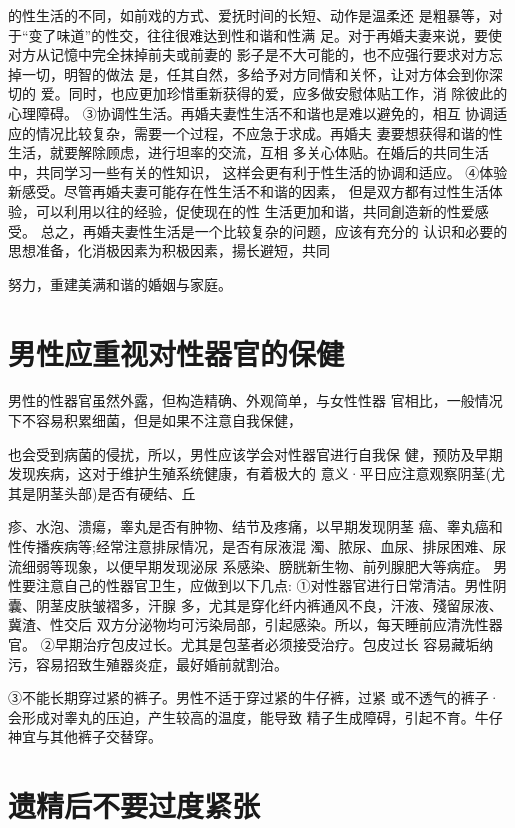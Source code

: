 \documentclass[12pt,UTF8]{ctexbook}
\begin{document}
的性生活的不同，如前戏的方式、爱抚时间的长短、动作是温柔还
是粗暴等，对于“变了味道”的性交，往往很难达到性和谐和性满
足。对于再婚夫妻来说，要使对方从记憶中完全抹掉前夫或前妻的
影子是不大可能的，也不应强行要求对方忘掉一切，明智的做法
是，任其自然，多给予对方同情和关怀，让对方体会到你深切的
爱。同时，也应更加珍惜重新获得的爱，应多做安慰体贴工作，消
除彼此的心理障碍。
③协调性生活。再婚夫妻性生活不和谐也是难以避免的，相互
协调适应的情况比较复杂，需要一个过程，不应急于求成。再婚夫
妻要想获得和谐的性生活，就要解除顾虑，进行坦率的交流，互相
多关心体贴。在婚后的共同生活中，共同学习一些有关的性知识，
这样会更有利于性生活的协调和适应。
④体验新感受。尽管再婚夫妻可能存在性生活不和谐的因素，
但是双方都有过性生活体验，可以利用以往的经验，促使现在的性
生活更加和谐，共同創造新的性爱感受。
总之，再婚夫妻性生活是一个比较复杂的问题，应该有充分的
认识和必要的思想准备，化消极因素为积极因素，揚长避短，共同

努力，重建美满和谐的婚姻与家庭。

\section{男性应重视对性器官的保健}

男性的性器官虽然外露，但构造精确、外观简单，与女性性器
官相比，一般情况下不容易积累细菌，但是如果不注意自我保健，

也会受到病菌的侵扰，所以，男性应该学会对性器官进行自我保
健，预防及早期发现疾病，这对于维护生殖系统健康，有着极大的
意义·平日应注意观察阴茎(尤其是阴茎头部)是否有硬结、丘

疹、水泡、溃瘍，睾丸是否有肿物、结节及疼痛，以早期发现阴茎
癌、睾丸癌和性传播疾病等;经常注意排尿情况，是否有尿液混
濁、脓尿、血尿、排尿困难、尿流细弱等现象，以便早期发现泌尿
系感染、膀胱新生物、前列腺肥大等病症。
男性要注意自己的性器官卫生，应做到以下几点:
①对性器官进行日常清洁。男性阴囊、阴茎皮肤皱褶多，汗腺
多，尤其是穿化纤内裤通风不良，汗液、殘留尿液、冀渣、性交后
双方分泌物均可污染局部，引起感染。所以，每天睡前应清洗性器
官。
②早期治疗包皮过长。尤其是包茎者必须接受治疗。包皮过长
容易藏垢纳污，容易招致生殖器炎症，最好婚前就割治。

③不能长期穿过紧的裤子。男性不适于穿过紧的牛仔裤，过紧
或不透气的裤子·会形成对睾丸的压迫，产生较高的温度，能导致
精子生成障碍，引起不育。牛仔神宜与其他裤子交替穿。


\section{遗精后不要过度紧张}
\end{document}
